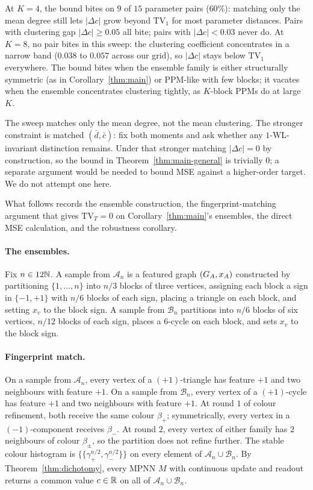 At $K = 4$, the bound bites on $9$ of $15$ parameter pairs
($60\%$): matching only the mean degree still lets $|\Delta c|$
grow beyond $\mathrm{TV}_1$ for most parameter distances. Pairs
with clustering gap $|\Delta c| \ge 0.05$ all bite; pairs with
$|\Delta c| < 0.03$ never do. At $K = 8$, no pair bites in this
sweep: the clustering coefficient concentrates in a narrow band
($0.038$ to $0.057$ across our grid), so $|\Delta c|$ stays
below $\mathrm{TV}_1$ everywhere. The bound bites when the
ensemble family is either structurally symmetric (as in
Corollary~\ref{thm:main}) or PPM-like with few blocks; it
vacates when the ensemble concentrates clustering tightly, as
$K$-block PPMs do at large $K$.

The sweep matches only the mean degree, not the mean clustering.
The stronger constraint is matched $(\bar d, \bar c)$: fix both moments and ask whether any
$1$-WL-invariant distinction remains. Under that stronger
matching $|\Delta c| = 0$ by construction, so the bound in
Theorem~\ref{thm:main-general} is trivially $0$; a separate
argument would be needed to bound MSE against a higher-order
target. We do not attempt one here.

What follows records the ensemble construction, the
fingerprint-matching argument that gives $\mathrm{TV}_T = 0$ on
Corollary~\ref{thm:main}'s ensembles, the direct MSE calculation,
and the robustness corollary.

\paragraph{The ensembles.} Fix $n \in 12\mathbb{N}$. A sample from
$\mathcal{A}_n$ is a featured graph $(G_A, x_A)$ constructed by
partitioning $\{1, \ldots, n\}$ into $n/3$ blocks of three
vertices, assigning each block a sign in $\{-1, +1\}$ with $n/6$
blocks of each sign, placing a triangle on each block, and setting
$x_v$ to the block sign. A sample from $\mathcal{B}_n$ partitions
into $n/6$ blocks of six vertices, $n/12$ blocks of each sign,
places a $6$-cycle on each block, and sets $x_v$ to the block sign.

\paragraph{Fingerprint match.} On a sample from $\mathcal{A}_n$,
every vertex of a $(+1)$-triangle has feature $+1$ and two
neighbours with feature $+1$. On a sample from $\mathcal{B}_n$,
every vertex of a $(+1)$-cycle has feature $+1$ and two neighbours
with feature $+1$. At round $1$ of colour refinement, both receive
the same colour $\beta_+$; symmetrically, every vertex in a
$(-1)$-component receives $\beta_-$. At round $2$, every vertex of
either family has $2$ neighbours of colour $\beta_\pm$, so the
partition does not refine further. The stable colour histogram is
$\{\!\!\{\gamma_+^{n/2}, \gamma_-^{n/2}\}\!\!\}$ on every element
of $\mathcal{A}_n \cup \mathcal{B}_n$. By
Theorem~\ref{thm:dichotomy}, every MPNN $M$ with continuous update
and readout returns a common value $c \in \mathbb{R}$ on all of
$\mathcal{A}_n \cup \mathcal{B}_n$.

